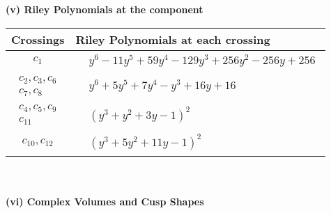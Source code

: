 \documentclass[1p]{elsarticle_modified}
\theoremstyle{definition}
\begin{document}
\newpage\renewcommand{\arraystretch}{1}
\flushleft \textbf{(v) Riley Polynomials at the component}\newline \\
\begin{tabular}{m{50pt}|m{274pt}}
Crossings & \hspace{64pt}Riley Polynomials at each crossing \\
\hline $$\begin{aligned}c_{1}\end{aligned}$$&$\begin{aligned}
&y^6-11 y^5+59 y^4-129 y^3+256 y^2-256 y+256
\end{aligned}$\\
\hline $$\begin{aligned}c_{2},c_{3},c_{6}\\c_{7},c_{8}\end{aligned}$$&$\begin{aligned}
&y^6+5 y^5+7 y^4- y^3+16 y+16
\end{aligned}$\\
\hline $$\begin{aligned}c_{4},c_{5},c_{9}\\c_{11}\end{aligned}$$&$\begin{aligned}
&(y^3+y^2+3 y-1)^2
\end{aligned}$\\
\hline $$\begin{aligned}c_{10},c_{12}\end{aligned}$$&$\begin{aligned}
&(y^3+5 y^2+11 y-1)^2
\end{aligned}$\\
\hline
\end{tabular}\\~\\
\newpage\flushleft \textbf{(vi) Complex Volumes and Cusp Shapes}
\end{document}
